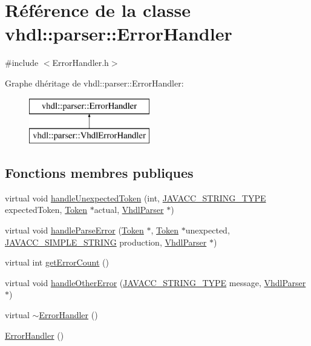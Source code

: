 \hypertarget{classvhdl_1_1parser_1_1_error_handler}{}\section{Référence de la classe vhdl\+:\+:parser\+:\+:Error\+Handler}
\label{classvhdl_1_1parser_1_1_error_handler}


{\ttfamily \#include $<$Error\+Handler.\+h$>$}

Graphe d\textquotesingle{}héritage de vhdl\+:\+:parser\+:\+:Error\+Handler\+:\begin{figure}[H]
\begin{center}
\leavevmode
\includegraphics[height=2.000000cm]{classvhdl_1_1parser_1_1_error_handler}
\end{center}
\end{figure}
\subsection*{Fonctions membres publiques}
\begin{DoxyCompactItemize}
\item 
virtual void \hyperlink{classvhdl_1_1parser_1_1_error_handler_aaec603e8777b06607723a86e3182a5d1}{handle\+Unexpected\+Token} (int, \hyperlink{_java_c_c_8h_a7941da0682a76ffa9869d8458e166062}{J\+A\+V\+A\+C\+C\+\_\+\+S\+T\+R\+I\+N\+G\+\_\+\+T\+Y\+P\+E} expected\+Token, \hyperlink{classvhdl_1_1parser_1_1_token}{Token} $\ast$actual, \hyperlink{classvhdl_1_1parser_1_1_vhdl_parser}{Vhdl\+Parser} $\ast$)
\item 
virtual void \hyperlink{classvhdl_1_1parser_1_1_error_handler_a2e740f3bb44e18d7816fd8d72f3e688e}{handle\+Parse\+Error} (\hyperlink{classvhdl_1_1parser_1_1_token}{Token} $\ast$, \hyperlink{classvhdl_1_1parser_1_1_token}{Token} $\ast$unexpected, \hyperlink{_java_c_c_8h_ac82c9f0881bc263341157153e0f2ae27}{J\+A\+V\+A\+C\+C\+\_\+\+S\+I\+M\+P\+L\+E\+\_\+\+S\+T\+R\+I\+N\+G} production, \hyperlink{classvhdl_1_1parser_1_1_vhdl_parser}{Vhdl\+Parser} $\ast$)
\item 
virtual int \hyperlink{classvhdl_1_1parser_1_1_error_handler_a8c83075a30c8b0ad7eca7aa59621a202}{get\+Error\+Count} ()
\item 
virtual void \hyperlink{classvhdl_1_1parser_1_1_error_handler_adbf0c9dd3ba91a9434bb0824127e79c5}{handle\+Other\+Error} (\hyperlink{_java_c_c_8h_a7941da0682a76ffa9869d8458e166062}{J\+A\+V\+A\+C\+C\+\_\+\+S\+T\+R\+I\+N\+G\+\_\+\+T\+Y\+P\+E} message, \hyperlink{classvhdl_1_1parser_1_1_vhdl_parser}{Vhdl\+Parser} $\ast$)
\item 
virtual \hyperlink{classvhdl_1_1parser_1_1_error_handler_a1a8bed6e39180859e6fda8b0543b6222}{$\sim$\+Error\+Handler} ()
\item 
\hyperlink{classvhdl_1_1parser_1_1_error_handler_a72b0456d8c4d2541b7ff734563cbe6be}{Error\+Handler} ()
\end{DoxyCompactItemize}
